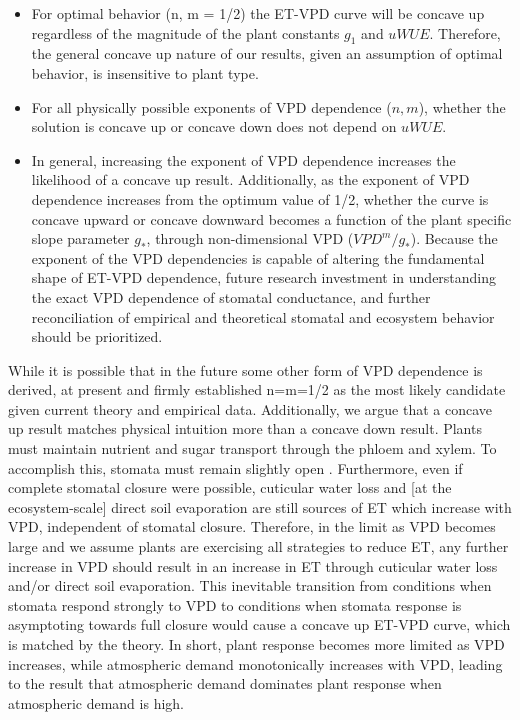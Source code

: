 \documentclass[draft,linenumbers]{afmjournal}
\begin{document}
\begin{itemize}
  \item For optimal behavior (n, m = 1/2) the ET-VPD curve will be
    concave up regardless of the magnitude of the plant constants
    $g_1$ and $uWUE$. Therefore, the general concave up nature of our
    results, given an assumption of optimal behavior, is insensitive
    to plant type.
  \item For all physically possible exponents of VPD dependence ($n,
    m$), whether the solution is concave up or concave down does not
    depend on $uWUE$.
  \item In general, increasing the exponent of VPD dependence
    increases the likelihood of a concave up result. Additionally, as
    the exponent of VPD dependence increases from the optimum value of
    1/2, whether the curve is concave upward or concave downward
    becomes a function of the plant specific slope parameter $g_*$,
    through non-dimensional VPD ($VPD^m/g_*$). Because the exponent of
    the VPD dependencies is capable of altering the fundamental shape
    of ET-VPD dependence, future research investment in understanding
    the exact VPD dependence of stomatal conductance, and further
    reconciliation of empirical and theoretical stomatal and
    ecosystem behavior should be prioritized.
\end{itemize}
While it is possible that in the future some other form of
VPD dependence is derived, at present \cite{MEDLYN_2011} and
\cite{Zhou_2014} firmly established n=m=1/2 as the most likely
candidate given current theory and empirical data. Additionally, we
argue that a concave up result matches physical intuition more than a
concave down result. Plants must maintain nutrient and sugar transport
through the phloem and xylem. To accomplish this, stomata must remain
slightly open \citep{De_2013, Nikinmaa_2013, Ryan_2014}. Furthermore,
even if complete stomatal closure were possible, cuticular water loss
and [at the ecosystem-scale] direct soil evaporation are still sources
of ET which increase with VPD, independent of stomatal
closure. Therefore, in the limit as VPD becomes large and we assume
plants are exercising all strategies to reduce ET, any further increase
in VPD should result in an increase in ET through cuticular water loss
and/or direct soil evaporation. This inevitable transition from
conditions when stomata respond strongly to VPD to conditions when
stomata response is asymptoting towards full closure would cause a
concave up ET-VPD curve, which is matched by the theory. In short,
plant response becomes more limited as VPD increases, while
atmospheric demand monotonically increases with VPD, leading to the
 result that atmospheric demand dominates plant response when
atmospheric demand is high.
\end{document}
